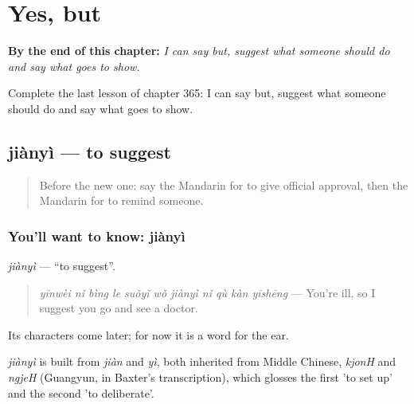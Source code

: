 
\chapter{Yes, but}
\label{ch:zh-yes-but}

\begin{chapteropening}
\textbf{By the end of this chapter:} \emph{I can say but, suggest what someone should do and say what goes to show.}

Complete the last lesson of chapter 365: I can say but, suggest what someone should do and say what goes to show.
\end{chapteropening}

\section[jiànyì]{jiànyì — to suggest}

\label{lesson:ZH-C365-jianyi}



\begin{quote}
Before the new one: say the Mandarin for to give official approval, then the Mandarin for to remind someone.
\end{quote}

\subsection*{You'll want to know: jiànyì}
\emph{jiànyì} — \textquotedblleft{}to suggest\textquotedblright{}.

\begin{quote}
\emph{yīnwèi nǐ bìng le suǒyǐ wǒ jiànyì nǐ qù kàn yīshēng} — You're ill, so I suggest you go and see a doctor.
\end{quote}

Its characters come later; for now it is a word for the ear.

\begin{cousinweb}
\emph{jiànyì} is built from \emph{jiàn} and \emph{yì}, both inherited from Middle Chinese, \emph{kjonH} and \emph{ngjeH} (Guangyun, in Baxter's transcription), which glosses the first 'to set up' and the second 'to deliberate'.
\end{cousinweb}

